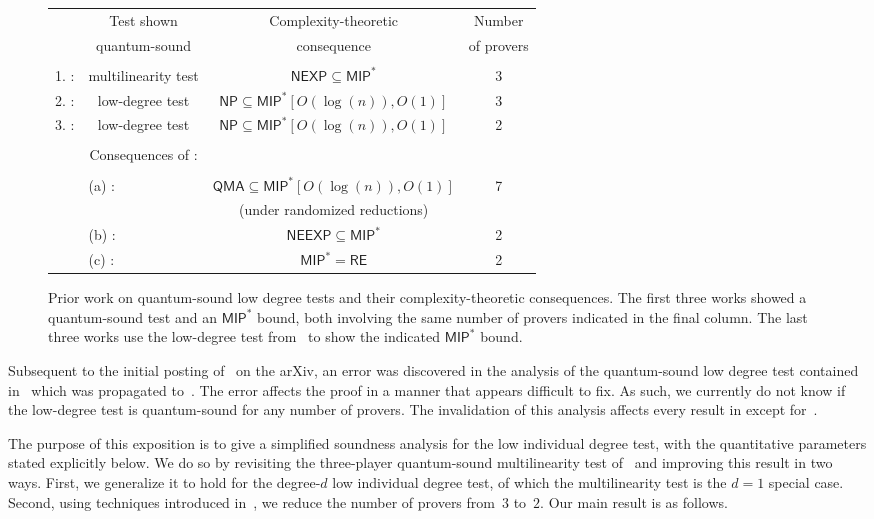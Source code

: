 \documentclass[11pt]{article}
\theoremstyle{definition}
\newcommand{\NP}{\mathsf{NP}}
\newcommand{\NEXP}{\mathsf{NEXP}}
\newcommand{\NEEXP}{\mathsf{NEEXP}}
\newcommand{\MIP}{\mathsf{MIP}}
\newcommand{\QMA}{\mathsf{QMA}}
\begin{document}
{
\begin{figure}
\begin{tabular}{l c c c}
& Test shown & Complexity-theoretic  & Number \\
&  quantum-sound &  consequence & of provers  \\
			& &&\\
1. \cite{IV12}: & multilinearity test & $\NEXP \subseteq \mathsf{MIP}^*$ & 3\\[1ex]
2. \cite{Vid16}: & low-degree test & $\NP \subseteq \mathsf{MIP}^*[O(\log(n)), O(1)]$  &3\\[1ex]
3. \cite{NV18b}: & low-degree test & $\NP \subseteq \mathsf{MIP}^*[O(\log(n)), O(1)]$ & 2\\
			& &&\\
& Consequences of \cite{NV18b}: & &\\
			& & &\\
&\multicolumn{1}{l}{\quad\qquad(a) \cite{NV18a}:}   & $\QMA \subseteq \mathsf{MIP}^*[O(\log(n)), O(1)]$ &7\\
&    & (under randomized reductions) &\\[1ex]
&\multicolumn{1}{l}{\quad\qquad (b) \cite{NW19}:}   & $\NEEXP \subseteq \mathsf{MIP}^*$ &2\\[1ex]
&\multicolumn{1}{l}{\quad\qquad (c) \cite{JNV+20}:}   & $\MIP^* = \mathsf{RE}$&2
\end{tabular}
	\caption{Prior work on quantum-sound low degree tests and their complexity-theoretic consequences.
			The first three works showed a quantum-sound test and an $\MIP^*$ bound,
			both involving the same number of provers indicated in the final column.
			The last three works use the low-degree test from~\cite{NV18b}
			to show the indicated $\MIP^*$ bound.}
\label{fig:research}
\end{figure}
}

Subsequent to the initial posting of~\cite{JNV+20} on the arXiv,
an error was discovered in the analysis of the quantum-sound low degree test
contained in~\cite{Vid16} which was propagated to~\cite{NV18b}. The error affects the proof in a manner that appears difficult to fix. As such, we currently do not know if the low-degree test is quantum-sound for any number of provers.
The invalidation of this analysis affects every result in  except for~\cite{IV12}.

The purpose of this exposition is to give a simplified soundness
analysis for the low individual degree test, with the quantitative
parameters stated explicitly below.
We do so by revisiting the three-player quantum-sound multilinearity test of~\cite{IV12}
and improving this result in two ways.
First, we generalize it to hold for the degree-$d$ low individual degree test,
of which the multilinearity test is the $d=1$ special case.
Second, using techniques introduced in~\cite{Vid16,NV18b},
we reduce the number of provers from~$3$ to~$2$.
Our main result is as follows.
\end{document}
